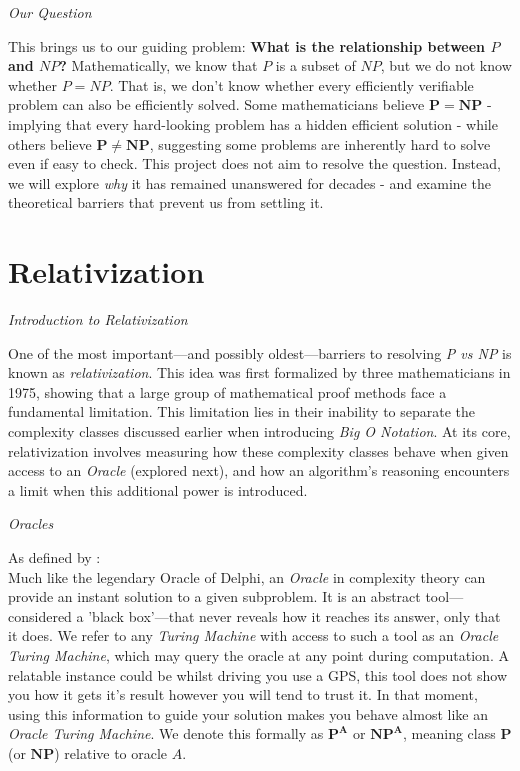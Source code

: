 \documentclass[12pt]{report}
\begin{document}
\begin{center}
    \vspace{0cm}
    {\Large\itshape Our Question\par}
\end{center}
This brings us to our guiding problem: \textbf{What is the relationship between $P$ and $NP$?}
Mathematically, we know that $P$ is a subset of $NP$, but we do not know whether $P = NP$. That is, we don't know whether every efficiently verifiable problem can also be efficiently solved.
Some mathematicians believe $\mathbf{P = NP}$ - implying that every hard-looking problem has a hidden efficient solution - while others believe $\mathbf{P \neq NP}$, suggesting some problems are inherently hard to solve even if easy to check.
This project does not aim to resolve the question. Instead, we will explore \textit{why} it has remained unanswered for decades - and examine the theoretical barriers that prevent us from settling it.

\section*{Relativization}
\begin{center}
    \vspace{0cm}
    {\Large\itshape Introduction to Relativization\par}
\end{center}
One of the most important—and possibly oldest—barriers to resolving \textit{P vs NP} is known as \textit{relativization}.
This idea was first formalized by three mathematicians in 1975, showing that a large group of mathematical proof methods face a fundamental limitation.
This limitation lies in their inability to separate the complexity classes discussed earlier when introducing \textit{Big O Notation}.
At its core, relativization involves measuring how these complexity classes behave when given access to an \textit{Oracle} (explored next), and how an algorithm's reasoning encounters a limit when this additional power is introduced.

\begin{center}
    \vspace{0cm}
    {\Large\itshape Oracles\par}
\end{center}
As defined by \cite{arora2009}:\\
Much like the legendary Oracle of Delphi, an \textit{Oracle} in complexity theory can provide an instant solution to a given subproblem.
It is an abstract tool—considered a 'black box'—that never reveals how it reaches its answer, only that it does.
We refer to any \textit{Turing Machine} with access to such a tool as an \textit{Oracle Turing Machine}, which may query the oracle at any point during computation.
A relatable instance could be whilst driving you use a GPS, this tool does not show you how it gets it's result however you will tend to trust it.
In that moment, using this information to guide your solution makes you behave almost like an \textit{Oracle Turing Machine}.
We denote this formally as $\mathbf{P^A}$ or $\mathbf{NP^A}$, meaning class $\mathbf{P}$ (or $\mathbf{NP}$) relative to oracle $A$.
\end{document}
